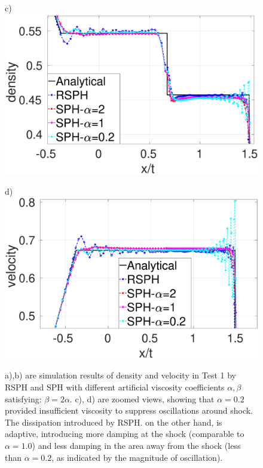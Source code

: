 \begin{figure}
    \begin{minipage}{.495\textwidth}
        \centering c)
        \includegraphics[width=0.99 \textwidth,height=0.7\textwidth]{./Chapter-4/Figures/Sod/RCM-Sod-SPH-alf-rho-zoom}
    \end{minipage}%
    \begin{minipage}{.495 \textwidth}
        \centering d)
        \includegraphics[width=0.99 \textwidth,height=0.7\textwidth]{./Chapter-4/Figures/Sod/RCM-Sod-SPH-alf-v-zoom}
    \end{minipage}%
    \caption{a),b) are simulation results of density and velocity in Test 1 by RSPH and SPH with different artificial viscosity coefficients $\alpha,\beta$ satisfying: $\beta=2\alpha$.  c), d) are zoomed views, showing that $\alpha=0.2$ provided insufficient viscosity to suppress oscillations around shock. The dissipation introduced by RSPH. on the other hand, is adaptive, introducing more damping at the shock (comparable to $\alpha=1.0$) and less damping in the area away from the shock (less than $\alpha=0.2$, as indicated by the magnitude of oscillation).}
    \label{fig:RCM-Sod-SPH-alf}
\end{figure}

